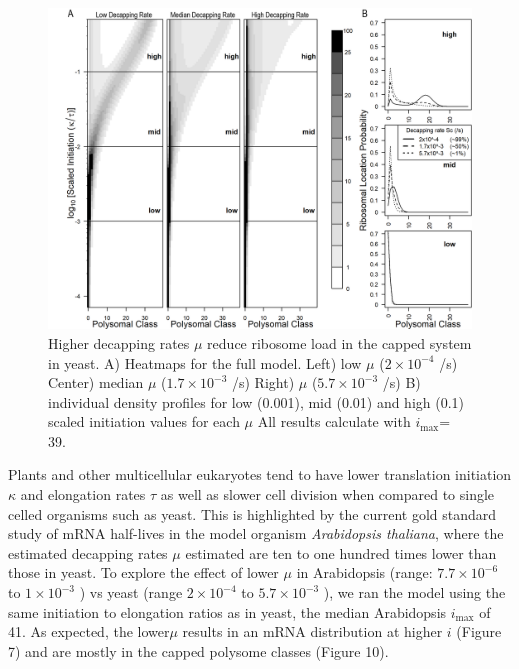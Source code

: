 \documentclass[a4,center,fleqn,nocrop]{NAR}
\newcommand{\imax}{\ensuremath{{i_{\max}}}\xspace}
\begin{document}
\begin{figure}[!ht]
\begin{center}
\includegraphics[width=140mm]{Images/2023-07-09_Figure2_Marking_Rate_range_medianlength_with_labels.png}
\caption{Higher decapping rates $\mu$ reduce ribosome load in the capped system in yeast.  A)  Heatmaps for the full model. Left) low $\mu$ ($2\times 10^{-4}$ /s) Center) median $\mu$ ($1.7\times 10^{-3}$ /s) Right) $\mu$ ($5.7\times 10^{-3}$ /s)  B) individual density profiles for low (0.001), mid (0.01) and high (0.1) scaled initiation values for each $\mu$ All results calculate with \imax = 39.}
\end{center}
\end{figure}


Plants and other multicellular eukaryotes tend to have lower translation initiation $\kappa$ and elongation rates $\tau$ as well as slower cell division when compared to single celled organisms such as yeast.
This is highlighted by the current gold standard study of mRNA half-lives in the model organism \textit{Arabidopsis thaliana}, where the estimated decapping rates $\mu$ estimated are ten to one hundred times lower than those in yeast. 
To explore the effect of lower $\mu$ in Arabidopsis (range: $7.7 \times 10^{-6}$ to $1 \times 10^{-3}$ ) vs yeast (range $2 \times 10^{-4}$ to $5.7 \times 10^{-3}$ ), we ran the model using the same initiation to elongation ratios as in yeast, the median Arabidopsis \imax of 41. 
As expected, the lower$\mu$ results in an mRNA distribution at higher $i$ (Figure 7) and are mostly in the capped polysome classes (Figure 10).
\end{document}

